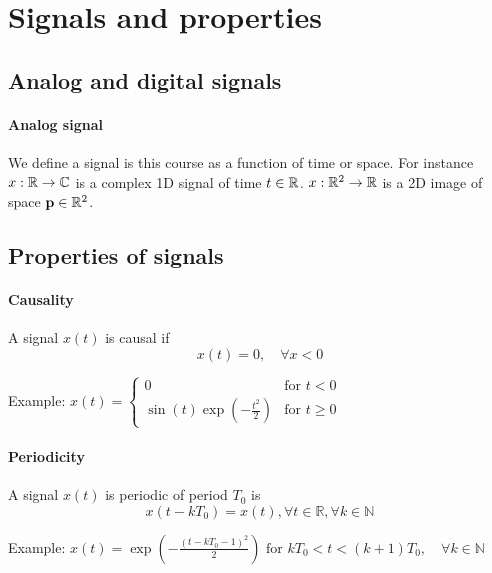 
\section{Signals and properties}

\subsection{Analog and digital signals}

\paragraph{Analog signal} We define a signal is this course as a function of
time or space. For instance $x:\mathbb{R}\rightarrow\mathbb{C}$ is a complex 1D signal of time
$t\in\mathbb{R}$. $x:\mathbb{R}^2\rightarrow\mathbb{R}$ is a 2D image of space $\mathbf{p}\in\mathbb{R}^2$.

\subsection{Properties of signals}

\paragraph{Causality}
A signal $x(t)$ is causal if 
$$ x(t)=0,\quad \forall x<0 $$

Example: $x(t)= \begin{cases}
0& \text{for } t<0\\
\sin(t)\exp\left(-\frac{t^2}{2}\right) & \text{for } t\geq 0
\end{cases}$

\paragraph{Periodicity}
A signal $x(t)$ is periodic of period $T_0$ is
$$x(t-kT_0)=x(t),  \forall t\in\mathbb{R}, \forall k\in\mathbb{N}$$      


Example: $x(t)= %
  \exp\left(-\frac{(t-kT_0-1)^2}{2}\right)  \text{ for }kT_0<t<(k+1)T_0,\quad
  \forall k\in\mathbb{N}$
  
